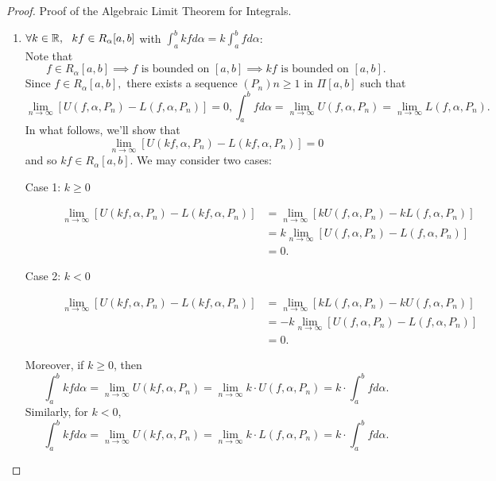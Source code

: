\begin{proof}
    Proof of the Algebraic Limit Theorem for Integrals.
    \begin{enumerate}
        \item $\forall k \in \mathbb{R}, ~~kf\in R_\alpha[a,b]$ with $\int_a^b kf d\alpha = k \int_a^b f d\alpha$: \\
        Note that 
        $$f\in R_\alpha[a,b] \implies f \text{ is bounded on } [a,b] \implies kf \text{ is bounded on } [a,b].$$
        Since $f \in R_\alpha [a,b],$ there exists a sequence $(P_n){n\geq 1}$ in $\Pi[a,b]$ such that 
        $$\lim_{n\to \infty}\left[U(f, \alpha, P_n) - L(f, \alpha, P_n)\right] = 0, \int_a^b fd\alpha = \lim_{n \to \infty} U(f, \alpha, P_n) = \lim_{n \to \infty} L (f, \alpha, P_n).$$
        In what follows, we'll show that
        $$\lim_{n \to \infty} \left[U(kf, \alpha, P_n) - L(kf, \alpha, P_n)\right] = 0$$
        and so $kf \in R_\alpha[a,b]$. We may consider two cases:
        \begin{description}
            \item[Case 1: $k \geq 0$]
            \begin{align*}
                \lim_{n \to \infty} \left[U(kf, \alpha, P_n) - L(kf, \alpha, P_n)\right] &= \lim_{n\to \infty} \left[kU(f, \alpha, P_n) - kL(f, \alpha, P_n)\right] \\ 
                &= k \lim_{n \to \infty} \left[U(f, \alpha, P_n) - L(f, \alpha, P_n)\right] \\ 
                &= 0.
            \end{align*}
            \item[Case 2: $k < 0$]
            \begin{align*}
                \lim_{n \to \infty} \left[U(kf, \alpha, P_n) - L(kf, \alpha, P_n)\right] &= \lim_{n \to \infty} \left[kL(f, \alpha, P_n) - kU(f, \alpha, P_n)\right] \\
                &= -k \lim_{n \to \infty} \left[U(f, \alpha, P_n) - L(f, \alpha, P_n)\right] \\ 
                &= 0.
            \end{align*} 
        \end{description}
        Moreover, if $k \geq 0$, then 
        $$\int_a^b kfd\alpha = \lim_{n\to \infty} U(kf, \alpha, P_n) = \lim_{n\to \infty}k \cdot U(f, \alpha, P_n) = k \cdot \int_a^b f d\alpha.$$
        Similarly, for $k < 0$,
        $$\int_a^b kfd\alpha = \lim_{n\to \infty} U(kf, \alpha, P_n) = \lim_{n\to \infty}k \cdot L(f, \alpha, P_n) = k \cdot \int_a^b f d\alpha.$$


\end{enumerate}
\end{proof}
